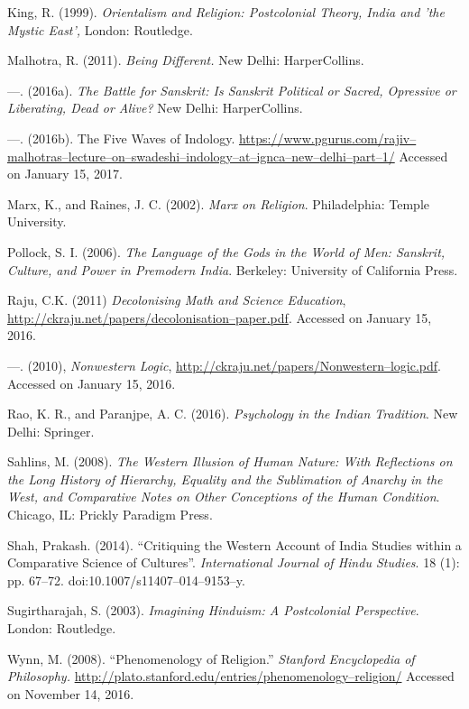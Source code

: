 \begin{thebibliography}{99}
  King, R. (1999). \textit{Orientalism and Religion: Postcolonial Theory, India and 'the Mystic East',} London: Routledge.

  Malhotra, R. (2011). \textit{Being Different.} New Delhi: HarperCollins.

  —. (2016a). \textit{The Battle for Sanskrit: Is Sanskrit Political or Sacred, Opressive or Liberating, Dead or Alive? } New Delhi: HarperCollins.

  —. (2016b). The Five Waves of Indology. \url{https://www.pgurus.com/rajiv–malhotras–lecture–on–swadeshi–indology–at–ignca–new–delhi–part–1/} Accessed on January 15, 2017.

  Marx, K., and Raines, J. C. (2002). \textit{Marx on Religion}. Philadelphia: Temple University.

  Pollock, S. I. (2006). \textit{The Language of the Gods in the World of Men: Sanskrit, Culture, and Power in Premodern India}. Berkeley: University of California Press.

  Raju, C.K. (2011) \textit{Decolonising Math and Science Education}, \url{http://ckraju.net/papers/decolonisation–paper.pdf}. Accessed on January 15, 2016.

  —. (2010), \textit{Nonwestern Logic}, \url{http://ckraju.net/papers/Nonwestern–logic.pdf}. Accessed on January 15, 2016.

  Rao, K. R., and Paranjpe, A. C. (2016). \textit{Psychology in the Indian Tradition}. New Delhi: Springer.

  Sahlins, M. (2008). \textit{The Western Illusion of Human Nature: With Reflections on the Long History of Hierarchy, Equality and the Sublimation of Anarchy in the West, and Comparative Notes on Other Conceptions of the Human Condition}. Chicago, IL: Prickly Paradigm Press.

  Shah, Prakash. (2014). “Critiquing the Western Account of India Studies within a Comparative Science of Cultures”. \textit{International Journal of Hindu Studies}. 18 (1): pp. 67–72. doi:10.1007/s11407–014–9153–y.

  Sugirtharajah, S. (2003). \textit{Imagining Hinduism: A Postcolonial Perspective}. London: Routledge.

  Wynn, M. (2008). “Phenomenology of Religion.” \textit{Stanford Encyclopedia of Philosophy.} \url{http://plato.stanford.edu/entries/phenomenology–religion/} Accessed on November 14, 2016.

 \end{thebibliography}

